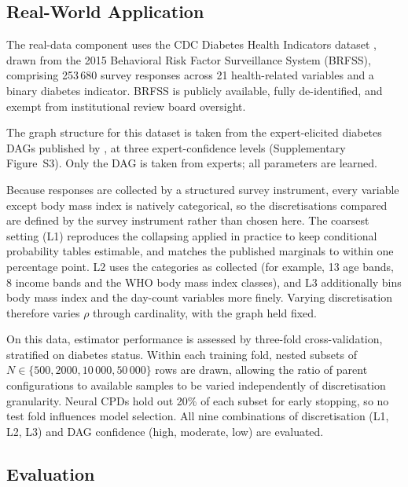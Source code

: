\documentclass[a4paper,fleqn]{cas-dc}
\begin{document}
\subsection{Real-World Application}

The real-data component uses the CDC Diabetes Health Indicators dataset \citep{cdc_diabetes_2023}, drawn from the 2015 Behavioral Risk Factor Surveillance System (BRFSS), comprising 253\,680 survey responses across 21 health-related variables and a binary diabetes indicator. BRFSS is publicly available, fully de-identified, and exempt from institutional review board oversight.

The graph structure for this dataset is taken from the expert-elicited diabetes DAGs published by \citet{zahoor2024investigatingvaliditystructurelearning}, at three expert-confidence levels (Supplementary Figure~S3). Only the DAG is taken from experts; all parameters are learned.

Because responses are collected by a structured survey instrument, every variable except body mass index is natively categorical, so the discretisations compared are defined by the survey instrument rather than chosen here. The coarsest setting (L1) reproduces the collapsing applied in practice to keep conditional probability tables estimable, and matches the published marginals to within one percentage point. L2 uses the categories as collected (for example, 13 age bands, 8 income bands and the WHO body mass index classes), and L3 additionally bins body mass index and the day-count variables more finely. Varying discretisation therefore varies $\rho$ through cardinality, with the graph held fixed.

On this data, estimator performance is assessed by three-fold cross-validation, stratified on diabetes status. Within each training fold, nested subsets of $N\in\{500, 2000, 10\,000, 50\,000\}$ rows are drawn, allowing the ratio of parent configurations to available samples to be varied independently of discretisation granularity. Neural CPDs hold out 20\% of each subset for early stopping, so no test fold influences model selection. All nine combinations of discretisation (L1, L2, L3) and DAG confidence (high, moderate, low) are evaluated.

\subsection{Evaluation}
\end{document}
